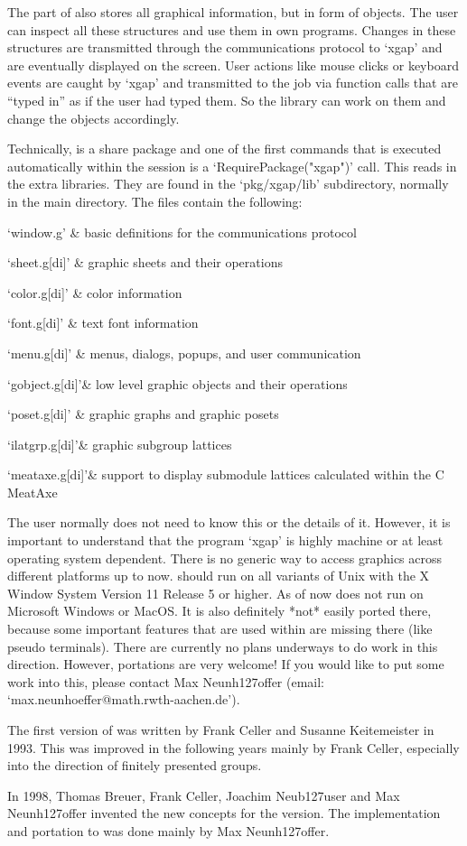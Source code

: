 The {\GAP} part of {\XGAP} also stores all graphical information, but in
form of {\GAP} objects. The user can inspect all these structures and use
them in own programs. Changes in these structures are transmitted through
the communications protocol to `xgap' and are eventually displayed on the
screen. User actions like mouse clicks or keyboard events are caught by
`xgap' and transmitted to the {\GAP} job via function calls that are
``typed in'' as if the user had typed them. So the library can work on them 
and change the {\GAP} objects accordingly.

Technically, {\XGAP} is a share package and one of the first commands that
is executed automatically within the {\GAP} session is a
`RequirePackage("xgap")' call. This reads in the extra {\XGAP}
libraries. They are found in the `pkg/xgap/lib' subdirectory, normally in the
main {\GAP} directory. The files contain the following:

\beginitems
`window.g' & basic definitions for the communications protocol

`sheet.g[di]' & graphic sheets and their operations 

`color.g[di]' & color information

`font.g[di]'  & text font information

`menu.g[di]'  & menus, dialogs, popups, and user communication

`gobject.g[di]'& low level graphic objects and their operations

`poset.g[di]' & graphic graphs and graphic posets

`ilatgrp.g[di]'& graphic subgroup lattices

`meataxe.g[di]'& support to display submodule lattices calculated within
the C MeatAxe
\enditems

The user normally does not need to know this or the details of it. However, 
it is important to understand that the program `xgap' is highly machine or
at least operating system dependent. There is no generic way to access
graphics across different platforms up to now. {\XGAP} should run on all
variants of Unix with the X Window System Version 11 Release 5 or
higher. As of now {\XGAP} does not run on Microsoft Windows or MacOS. It is 
also definitely *not* easily ported there, because some important features
that are used within {\XGAP} are missing there (like pseudo terminals).
There are currently no plans underways to do work in this direction.
However, portations are very welcome! If you would like to put some work
into this, please contact Max Neunh\accent127offer (email:
`max.neunhoeffer@math.rwth-aachen.de'). 


The first version of {\XGAP} was written by Frank Celler and Susanne
Keitemeister in 1993. This was improved in the following years mainly by
Frank Celler, especially into the direction of finitely presented groups.

In 1998, Thomas Breuer, Frank Celler, Joachim Neub\accent127user and Max
Neunh\accent127offer invented the new concepts for the {}
version. The implementation and portation to {} was done mainly by Max
Neunh\accent127offer. 